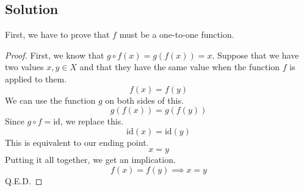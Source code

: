 \documentclass[12pt]{report}
\begin{document}
\subsection{Solution}
\newcommand{\id}{\text{id}}
First, we have to prove that $f$ must be a one-to-one function.
\begin{proof}
    First, we know that $g \circ f(x) = g(f(x)) = x$. 
    Suppose that we have two values $x, y \in X$ and that they have the same value when the function $f$ is applied to them.
    \begin{equation}
        f(x) = f(y)
    \end{equation} 
    We can use the function $g$ on both sides of this.
    \begin{equation}
        g(f(x)) = g(f(y))
    \end{equation}
    Since $g \circ f = \id$, we replace this.
    \begin{equation}
        \id(x) = \id(y)
    \end{equation}
    This is equivalent to our ending point.
    \begin{equation}
        x = y
    \end{equation}
    Putting it all together, we get an implication.
    \begin{equation}
        f(x) = f(y) \implies x = y
    \end{equation}
    Q.E.D.
\end{proof}
\end{document}
